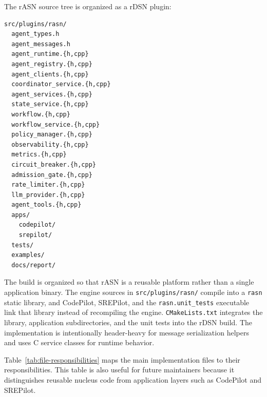 \documentclass[manuscript,screen,review]{acmart}
\newcommand{\rasn}{rASN\xspace}
\newcommand{\rdsn}{rDSN\xspace}
\newcommand{\codepilot}{CodePilot\xspace}
\newcommand{\cpp}{C\nolinebreak\hspace{-.05em}\raisebox{.4ex}{\tiny\bf ++}\xspace}
\begin{document}
The \rasn source tree is organized as a \rdsn plugin:

\begin{lstlisting}
src/plugins/rasn/
  agent_types.h
  agent_messages.h
  agent_runtime.{h,cpp}
  agent_registry.{h,cpp}
  agent_clients.{h,cpp}
  coordinator_service.{h,cpp}
  agent_services.{h,cpp}
  state_service.{h,cpp}
  workflow.{h,cpp}
  workflow_service.{h,cpp}
  policy_manager.{h,cpp}
  observability.{h,cpp}
  metrics.{h,cpp}
  circuit_breaker.{h,cpp}
  admission_gate.{h,cpp}
  rate_limiter.{h,cpp}
  llm_provider.{h,cpp}
  agent_tools.{h,cpp}
  apps/
    codepilot/
    srepilot/
  tests/
  examples/
  docs/report/
\end{lstlisting}

The build is organized so that rASN is a reusable platform rather than a
single application binary. The engine sources in \texttt{src/plugins/rasn/}
compile into a \texttt{rasn} static library, and \codepilot, SREPilot, and the
\texttt{rasn.unit\_tests} executable link that library instead of recompiling
the engine. \texttt{CMakeLists.txt} integrates the library, application
subdirectories, and the unit tests into the \rdsn build. The implementation is
intentionally header-heavy for message serialization helpers and uses \cpp
service classes for runtime behavior.

Table~\ref{tab:file-responsibilities} maps the main implementation files to
their responsibilities. This table is also useful for future maintainers because
it distinguishes reusable nucleus code from application layers such as CodePilot
and SREPilot.
\end{document}
